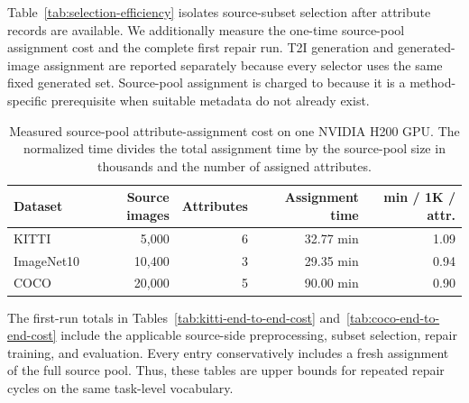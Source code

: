 Table~\ref{tab:selection-efficiency} isolates source-subset selection after attribute records are available. We additionally measure the one-time source-pool assignment cost and the complete first repair run. T2I generation and generated-image assignment are reported separately because every selector uses the same fixed generated set. Source-pool assignment is charged to \model because it is a method-specific prerequisite when suitable metadata do not already exist.

\begin{table}[htbp]
\centering
\caption{Measured source-pool attribute-assignment cost on one NVIDIA H200 GPU. The normalized time divides the total assignment time by the source-pool size in thousands and the number of assigned attributes.}
\label{tab:source-assignment-cost}
\small
\setlength{\tabcolsep}{4pt}
\begin{tabular}{l r r r r}
\toprule
\rowcolor{sectiongray} \textbf{Dataset} & \textbf{Source images} & \textbf{Attributes} & \textbf{Assignment time} & \textbf{min / 1K / attr.} \\
\midrule
KITTI & 5,000 & 6 & 32.77 min & 1.09 \\
ImageNet10 & 10,400 & 3 & 29.35 min & 0.94 \\
COCO & 20,000 & 5 & 90.00 min & 0.90 \\
\bottomrule
\end{tabular}
\end{table}

The first-run totals in Tables~\ref{tab:kitti-end-to-end-cost} and~\ref{tab:coco-end-to-end-cost} include the applicable source-side preprocessing, subset selection, repair training, and evaluation. Every \model entry conservatively includes a fresh assignment of the full source pool. Thus, these tables are upper bounds for repeated repair cycles on the same task-level vocabulary.

